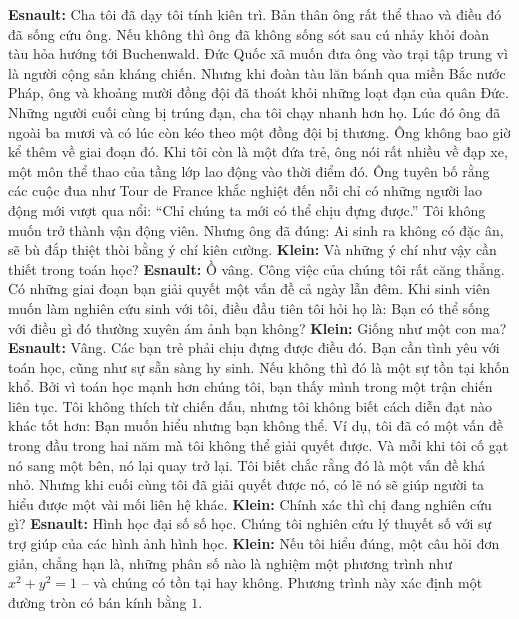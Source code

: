 \begin{multicols}{2}
	\vskip 0.1cm
	\textbf{\color{doithoaitoanhoc}Esnault:} Cha tôi đã dạy tôi tính kiên trì. Bản thân ông rất thể thao và điều đó đã sống cứu ông. Nếu không thì ông đã không sống sót sau cú nhảy khỏi đoàn tàu hỏa hướng tới Buchenwald. Đức Quốc xã muốn đưa ông vào trại tập trung vì là người cộng sản kháng chiến. Nhưng khi đoàn tàu lăn bánh qua miền Bắc nước Pháp, ông và khoảng mười đồng đội đã thoát khỏi những loạt đạn của quân Đức. Những người cuối cùng bị trúng đạn, cha tôi chạy nhanh hơn họ. Lúc đó ông đã ngoài ba mươi và có lúc còn kéo theo một đồng đội bị thương. Ông không bao giờ kể thêm về giai đoạn đó. Khi tôi còn là một đứa trẻ, ông nói rất nhiều về đạp xe, một môn thể thao của tầng lớp lao động vào thời điểm đó. Ông tuyên bố rằng các cuộc đua như Tour de France khắc nghiệt đến nỗi chỉ có những người lao động mới vượt qua nổi: ``Chỉ chúng ta mới có thể chịu đựng được.” Tôi không muốn trở thành vận động viên. Nhưng ông đã đúng: Ai sinh ra không có đặc ân, sẽ bù đắp thiệt thòi bằng ý chí kiên cường.
	\vskip 0.1cm
	\textbf{\color{doithoaitoanhoc}Klein:} Và những ý chí như vậy cần thiết trong toán học?
	\vskip 0.1cm
	\textbf{\color{doithoaitoanhoc}Esnault:} Ồ vâng. Công việc của chúng tôi rất căng thẳng. Có những giai đoạn bạn giải quyết một vấn đề cả ngày lẫn đêm. Khi sinh viên muốn làm nghiên cứu sinh với tôi, điều đầu tiên tôi hỏi họ là: Bạn có thể sống với điều gì đó thường xuyên ám ảnh bạn không? 
	\vskip 0.1cm
	\textbf{\color{doithoaitoanhoc}Klein:} Giống như một con ma?
	\vskip 0.1cm
	\textbf{\color{doithoaitoanhoc}Esnault:} Vâng. Các bạn trẻ phải chịu đựng được điều đó. Bạn cần tình yêu với toán học, cũng như sự sẵn sàng hy sinh. Nếu không thì đó là một sự tồn tại khốn khổ. Bởi vì toán học mạnh hơn chúng tôi, bạn thấy mình trong một trận chiến liên tục. Tôi không thích từ chiến đấu, nhưng tôi không biết cách diễn đạt nào khác tốt hơn: Bạn muốn hiểu nhưng bạn không thể. Ví dụ, tôi đã có một vấn đề trong đầu trong hai năm mà tôi không thể giải quyết được. Và mỗi khi tôi cố gạt nó sang một bên, nó lại quay trở lại. Tôi biết chắc rằng đó là một vấn đề khá nhỏ. Nhưng khi cuối cùng tôi đã giải quyết được nó, có lẽ nó sẽ giúp người ta hiểu được một vài mối liên hệ khác.
	\vskip 0.1cm
	\textbf{\color{doithoaitoanhoc}Klein:} Chính xác thì chị đang nghiên cứu gì?
	\vskip 0.1cm
	\textbf{\color{doithoaitoanhoc}Esnault:} Hình học đại số số học. Chúng tôi nghiên cứu lý thuyết số với sự trợ giúp của các hình ảnh hình học.
	\vskip 0.1cm
	\textbf{\color{doithoaitoanhoc}Klein:} Nếu tôi hiểu đúng, một câu hỏi đơn giản, chẳng hạn là, những phân số nào là nghiệm một phương trình như $x^2 + y^2 = 1$ -- và chúng có tồn tại hay không. Phương \linebreak trình này xác định một đường tròn có bán kính bằng $1$.

\end{multicols}
